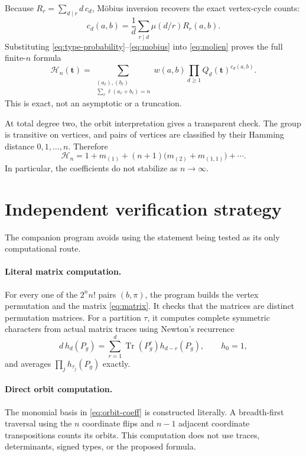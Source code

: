 \documentclass[11pt]{article}
\newcommand{\Tr}{\operatorname{Tr}}
\begin{document}
Because $R_r=\sum_{d\mid r}d\,c_d$, Möbius inversion recovers the exact
vertex-cycle counts:
\begin{equation}\label{eq:mobius}
c_d(a,b)=\frac1d\sum_{r\mid d}\mu(d/r)R_r(a,b).
\end{equation}
Substituting \eqref{eq:type-probability}--\eqref{eq:mobius} into
\eqref{eq:molien} proves the full finite-$n$ formula
\begin{equation}\label{eq:full-formula}
\boxed{
\mathcal H_n(\mathbf t)=
\sum_{\substack{(a_\ell),(b_\ell)\\
\sum_\ell\ell(a_\ell+b_\ell)=n}}
w(a,b)\prod_{d\geq1}Q_d(\mathbf t)^{c_d(a,b)}.
}
\end{equation}
This is exact, not an asymptotic or a truncation.

At total degree two, the orbit interpretation gives a transparent check.
The group is transitive on vertices, and pairs of vertices are classified by
their Hamming distance $0,1,\ldots,n$.  Therefore
\begin{equation}\label{eq:degree-two}
\mathcal H_n
=1+m_{(1)}+(n+1)\bigl(m_{(2)}+m_{(1,1)}\bigr)+\cdots.
\end{equation}
In particular, the coefficients do not stabilize as $n\to\infty$.

\section{Independent verification strategy}
The companion program avoids using the statement being tested as its only
computational route.

\paragraph{Literal matrix computation.}
For every one of the $2^n n!$ pairs $(b,\pi)$, the program builds the vertex
permutation and the matrix \eqref{eq:matrix}.  It checks that the matrices are
distinct permutation matrices.  For a partition $\tau$, it computes complete
symmetric characters from actual matrix traces using Newton's recurrence
\begin{equation}\label{eq:newton}
d\,h_d(P_g)=\sum_{r=1}^d\Tr(P_g^r)h_{d-r}(P_g),
\qquad h_0=1,
\end{equation}
and averages $\prod_jh_{\tau_j}(P_g)$ exactly.

\paragraph{Direct orbit computation.}
The monomial basis in \eqref{eq:orbit-coeff} is constructed literally.  A
breadth-first traversal using the $n$ coordinate flips and $n-1$ adjacent
coordinate transpositions counts its orbits.  This computation does not use
traces, determinants, signed types, or the proposed formula.
\end{document}
